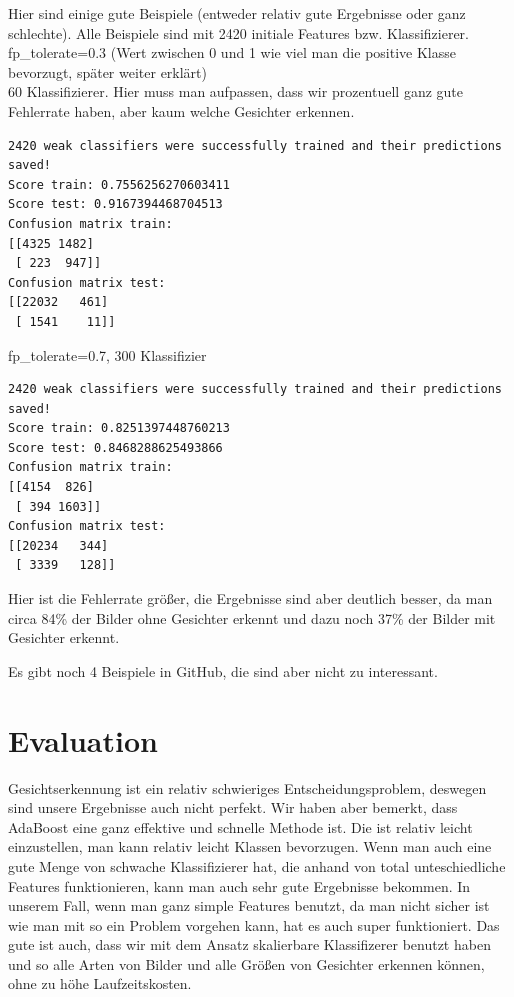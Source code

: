Hier sind einige gute Beispiele (entweder relativ gute Ergebnisse oder ganz schlechte). Alle
Beispiele sind mit 2420 initiale Features bzw. Klassifizierer. \\

fp\_tolerate=0.3 (Wert zwischen 0 und 1 wie viel man die positive Klasse bevorzugt, später weiter erklärt) \\
60 Klassifizierer. Hier muss man aufpassen, dass wir prozentuell ganz gute Fehlerrate haben, aber kaum
welche Gesichter erkennen.

\begin{lstlisting}
2420 weak classifiers were successfully trained and their predictions saved!
Score train: 0.7556256270603411
Score test: 0.9167394468704513
Confusion matrix train:
[[4325 1482]
 [ 223  947]]
Confusion matrix test:
[[22032   461]
 [ 1541    11]]
\end{lstlisting}


fp\_tolerate=0.7, 300 Klassifizier
\begin{lstlisting}
2420 weak classifiers were successfully trained and their predictions saved!
Score train: 0.8251397448760213
Score test: 0.8468288625493866
Confusion matrix train:
[[4154  826]
 [ 394 1603]]
Confusion matrix test:
[[20234   344]
 [ 3339   128]]

\end{lstlisting}

Hier ist die Fehlerrate größer, die Ergebnisse sind aber deutlich besser, da man circa 84\% der Bilder ohne
Gesichter erkennt und dazu noch 37\% der Bilder mit Gesichter erkennt.

Es gibt noch 4 Beispiele in GitHub, die sind aber nicht zu interessant.


\section*{Evaluation}

Gesichtserkennung ist ein relativ schwieriges Entscheidungsproblem, deswegen sind unsere Ergebnisse auch nicht
perfekt. Wir haben aber bemerkt, dass AdaBoost eine ganz effektive und schnelle Methode ist. Die ist relativ
leicht einzustellen, man kann relativ leicht Klassen bevorzugen. Wenn man auch eine gute Menge von schwache
Klassifizierer hat, die anhand von total unteschiedliche Features funktionieren, kann man auch sehr gute
Ergebnisse bekommen. In unserem Fall, wenn man ganz simple Features benutzt, da man nicht sicher ist wie man mit
so ein Problem vorgehen kann, hat es auch super funktioniert. Das gute ist auch, dass wir mit dem Ansatz skalierbare
Klassifizerer benutzt haben und so alle Arten von Bilder und alle Größen von Gesichter erkennen können, ohne zu höhe
Laufzeitskosten.

